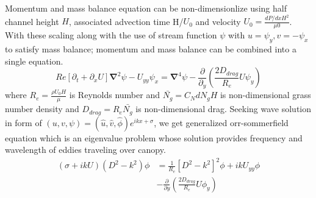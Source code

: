 \documentclass[aps,twocolumn,floatfix,prl,10pt]{revtex4-1}
\newcommand{\grad}{\mathbf{\nabla}}
\newcommand{\del}{\partial}
\begin{document}
Momentum and mass balance equation can be non-dimensionlize using half channel height $H$, associated advection time H/$U_0$ and velocity $U_0 = \frac{dP/dxH^2}{\mu0}$.
With these scaling along with the use of stream function $\psi$ with $u = \psi_{y}, v= -\psi_x$ to satisfy mass balance; momentum and mass balance can be combined 
into a single equation.
\begin{equation}
Re\left[\del_t+\del_x U \right]\grad^2\psi - U_{yy}\psi_x = \grad^4\psi-\frac{\del}{\del_y}\left(\frac{2D_{drag}}{R_e}U\psi_y\right)
\end{equation}
where $R_{e}= \frac{\rho U_0 H}{\mu}$ is Reynolds number and $\bar{N_g} = C_N d N_g H$ is non-dimensional grass number density and  $D_{drag} = R_{e}\bar{N_{g}}$ is 
non-dimensional drag. Seeking wave solution in form of $\left(u,v,\psi \right)= \left(\hat u, \hat v, \hat\phi \right)e^{ikx+\sigma}$, we get generalized orr-sommerfield equation 
which is an eigenvalue problem whose solution provides frequency and wavelength of eddies traveling over canopy.
\begin{equation}
\begin{split}
\left(\sigma+ikU\right) \left(D^2-k^2\right)\phi &= \frac{1}{R_{e}}\left[D^2 -k^{2} \right]^2\phi +ikU_{yy}\phi\\
&-\frac{\del}{\del y}\left(\frac{2D_{drag}}{R_e}U\phi_y\right)
\end{split}
\end{equation}
\end{document}
